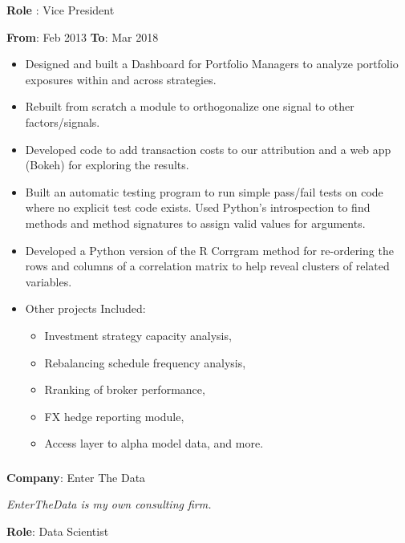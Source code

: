 \documentclass[
]{article}
\providecommand{\tightlist}{%
  \setlength{\itemsep}{0pt}\setlength{\parskip}{0pt}}
\begin{document}
{{\begin{flushleft}
\textbf{Role} : Vice President
\end{flushleft}

\textbf{From}: Feb 2013 \hspace{0.5in}  \textbf{To}: Mar 2018\\

\begin{itemize}
\tightlist
\item
  Designed and built a Dashboard for Portfolio Managers to analyze
  portfolio exposures within and across strategies.
\item
  Rebuilt from scratch a module to orthogonalize one signal to other
  factors/signals.
\item
  Developed code to add transaction costs to our attribution and a web
  app (Bokeh) for exploring the results.
\item
  Built an automatic testing program to run simple pass/fail tests on
  code where no explicit test code exists. Used Python's introspection
  to find methods and method signatures to assign valid values for
  arguments.
\item
  Developed a Python version of the R Corrgram method for re-ordering
  the rows and columns of a correlation matrix to help reveal clusters
  of related variables.
\item
  Other projects Included:

  \begin{itemize}
  \tightlist
  \item
    Investment strategy capacity analysis,
  \item
    Rebalancing schedule frequency analysis,
  \item
    Rranking of broker performance,
  \item
    FX hedge reporting module,
  \item
    Access layer to alpha model data, and more.
  \end{itemize}
\end{itemize}

\hypertarget{enterthedata}{\subsubsection{}\label{enterthedata}}
\begin{flushleft}
\textbf{Company}: Enter The Data
\end{flushleft}
{\hspace{.1in} \footnotesize \emph{EnterTheData is my own consulting firm.}}
\begin{flushleft}
\textbf{Role}: Data Scientist
\end{flushleft}

}}
\end{document}
